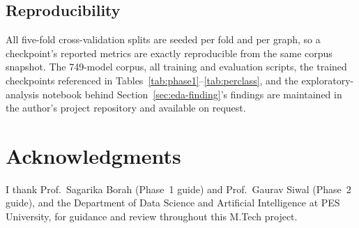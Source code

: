 \documentclass[sn-mathphys,Numbered]{sn-jnl}
\begin{document}
\subsection*{Reproducibility}
All five-fold cross-validation splits are seeded per fold and per graph, so a checkpoint's reported metrics are exactly reproducible from the same corpus snapshot. The 749-model corpus, all training and evaluation scripts, the trained checkpoints referenced in Tables~\ref{tab:phase1}--\ref{tab:perclass}, and the exploratory-analysis notebook behind Section~\ref{sec:eda-finding}'s findings are maintained in the author's project repository and available on request.

\backmatter

\section*{Acknowledgments}
I thank Prof.~Sagarika Borah (Phase~1 guide) and Prof.~Gaurav Siwal (Phase~2 guide), and the Department of Data Science and Artificial Intelligence at PES University, for guidance and review throughout this M.Tech project.


\end{document}
